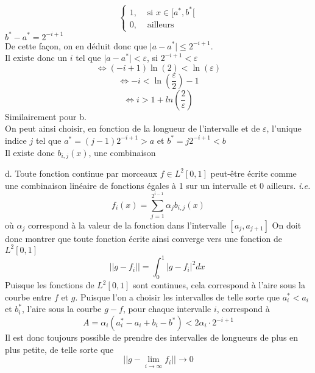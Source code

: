 \documentclass[letterpaper,12pt,oneside,final]{book}
\begin{document}
\begin{enumerate}[a)]
\[\begin{cases}
    1, & \text{ si } x\in [a^{*},b^{*}[\\ 
    0, & \text{ ailleurs}
\end{cases} \]
  \( b^{*}-a^{*} = 2^{-i+1} \)\\
De cette façon, on en déduit donc que \( \lvert a - a^{*} \rvert \leq 2^{-i+1} \).\\ 
Il existe donc un \( i \) tel que \( \lvert a-a^{*} \rvert < \varepsilon \), si \( 2^{-i+1} < \varepsilon \)
\[ \iff (-i+1)\ln(2) < \ln(\varepsilon) \]
\[ \iff -i < \ln(\frac{\varepsilon}{2})-1 \]
\[ \iff i > 1+ln\left(\frac{2}{\varepsilon}\right) \]
Similairement pour b. \\ 
On peut ainsi choisir, en fonction de la longueur de l'intervalle et de \( \varepsilon \), l'unique indice \( j \) tel que 
\( a^{*}=(j-1)2^{-i+1} > a  \) et \( b^{*} = j2^{-i+1} < b \)\\ 
Il existe donc \( b_{i,j}(x) \), une combinaison  

d. Toute fonction continue par morceaux \(f\in L^{2}[0,1] \) peut-être écrite comme une combinaison linéaire de fonctions 
égales à 1 sur un intervalle et 0 ailleurs. \textit{i.e.}
\[ f_{i}(x) = \sum_{j=1}^{2^{i-1}} \alpha_{j} b_{i,j} (x) \]
où \( \alpha_{j} \) correspond à la valeur de la fonction dans l'intervalle \( [a_{j},a_{j+1}] \)
On doit donc montrer que toute fonction écrite ainsi converge vers une fonction de \( L^{2}[0,1] \)
\[ \lvert \lvert  g-f_{i} \rvert \rvert = \int_{0}^{1}\lvert g-f_{i} \rvert ^{2} dx \; \] 
Puisque les fonctions de \( L^{2}[0,1] \) sont continues, cela correspond à l'aire sous la courbe 
entre \( f \) et \( g \). Puisque l'on a choisir les intervalles de telle sorte que 
\( a_{i}^{*} < a_{i} \) et \( b_{i}^{*} \), l'aire sous la courbe \( g-f \), pour chaque intervalle \( i \), correspond à 
\[ A = \alpha_{i}(a_{i}^{*}-a_{i} + b_{i}-b^{*}) < 2 \alpha_{i} \cdot 2^{-i+1} \]
Il est donc toujours possible de prendre des intervalles de longueurs de plus en plus petite, de telle sorte que 
\[ \lvert \lvert  g - \lim_{i \to \infty} f_{i} \rvert \rvert \rightarrow 0 \]

\end{enumerate}



\newpage
\end{document}
